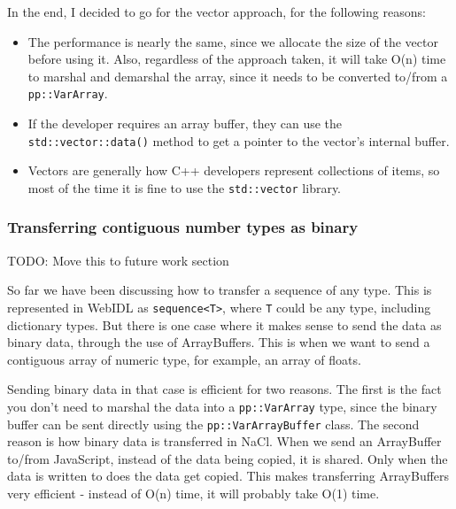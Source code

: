 In the end, I decided to go for the vector approach, for the following reasons:

\begin{itemize}
	\item The performance is nearly the same, since we allocate the size of the vector before using it. Also, regardless of the approach taken, it will take O(n) time to marshal and demarshal the array, since it needs to be converted to/from a \lstinline{pp::VarArray}.
	\item If the developer requires an array buffer, they can use the \lstinline{std::vector::data()} method to get a pointer to the vector's internal buffer.
	\item Vectors are generally how C++ developers represent collections of items, so most of the time it is fine to use the \lstinline{std::vector} library.
\end{itemize}

\subsubsection{Transferring contiguous number types as binary} %
\label{ssub:transferring_binary}
TODO: Move this to future work section

So far we have been discussing how to transfer a sequence of any type. This is represented in WebIDL as \lstinline{sequence<T>}, where \lstinline{T} could be any type, including dictionary types. But there is one case where it makes sense to send the data as binary data, through the use of ArrayBuffers. This is when we want to send a contiguous array of numeric type, for example, an array of floats. 

Sending binary data in that case is efficient for two reasons. The first is the fact you don't need to marshal the data into a \lstinline{pp::VarArray} type, since the binary buffer can be sent directly using the \lstinline{pp::VarArrayBuffer} class. The second reason is how binary data is transferred in NaCl. When we send an ArrayBuffer to/from JavaScript, instead of the data being copied, it is shared. Only when the data is written to does the data get copied. This makes transferring ArrayBuffers very efficient - instead of O(n) time, it will probably take O(1) time.

